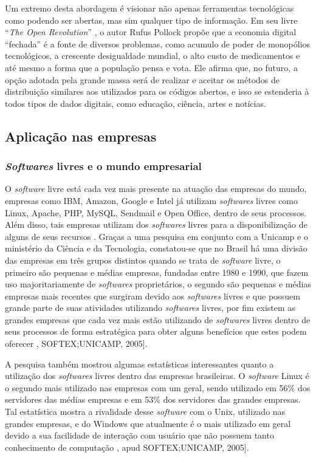 \documentclass[12pt]{article}
\begin{document}
Um extremo desta abordagem é visionar não apenas ferramentas tecnológicas como podendo ser abertas, mas sim qualquer tipo de informação. Em seu livre ``\textit{The Open Revolution}'' \cite{Pollock_2018}, o autor Rufus Pollock propõe que a economia digital ``fechada'' é a fonte de diversos problemas, como acumulo de poder de monopólios tecnológicos, a crescente desigualdade mundial, o alto custo de medicamentos e até mesmo a forma que a população pensa e vota. Ele afirma que, no futuro, a opção adotada pela grande massa será de realizar e aceitar os métodos de distribuição similares aos utilizados para os códigos abertos, e isso se estenderia à todos tipos de dados digitais, como educação, ciência, artes e notícias.


\subsection{Aplicação nas empresas}

\subsubsection{\textit{Softwares} livres e o mundo empresarial}

O \textit{software} livre está cada vez mais presente na atuação das empresas do mundo, empresas como IBM, Amazon, Google e Intel já utilizam \textit{softwares} livres como Linux, Apache, PHP, MySQL, Sendmail e Open Office, dentro de seus processos. Além disso, tais empresas utilizam dos \textit{softwares} livres para a disponibilização de alguns de seus recursos \cite{cerqueira2011}. Graças a uma pesquisa em conjunto com a Unicamp e o ministério da Ciência e da Tecnologia, constatou-se que no Brasil há uma divisão das empresas em três grupos distintos quando se trata de \textit{software} livre, o primeiro são pequenas e médias empresas, fundadas entre 1980 e 1990, que fazem uso majoritariamente de \textit{softwares} proprietários, o segundo são pequenas e médias empresas mais recentes que surgiram devido aos \textit{softwares} livres e que possuem grande parte de suas atividades utilizando \textit{softwares} livres, por fim existem as grandes empresas que cada vez mais estão utilizando de \textit{softwares} livres dentro de seus processos de forma estratégica para obter alguns benefícios que estes podem oferecer \cite{cerqueira2011}, SOFTEX;UNICAMP, 2005].

A pesquisa também mostrou algumas estatísticas interessantes quanto a utilização dos \textit{softwares} livres dentro das empresas brasileiras. O \textit{software} Linux é o segundo mais utilizado nas empresas com um geral, sendo utilizado em 56\% dos servidores das médias empresas e em 53\% dos servidores das grandes empresas. Tal estatística mostra a rivalidade desse \textit{software} com o Unix, utilizado nas grandes empresas, e do Windows que atualmente é o mais utilizado em geral devido a sua facilidade de interação com usuário que não possuem tanto conhecimento de computação \cite{cerqueira2011}, apud SOFTEX;UNICAMP, 2005].
\end{document}
